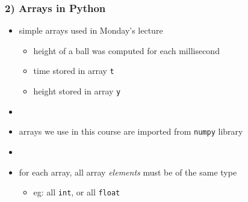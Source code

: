 \documentclass[14pt]{beamer}
\newcommand\red[1]{{\color{red} #1}}
\begin{document}
\begin{frame}[fragile]

\frametitle{2) Arrays in Python}

\begin{itemize}
	\item simple arrays used in Monday's lecture
	\begin{itemize}
		\item height of a ball was computed for each millisecond
		\item time stored in array \texttt{t}
		\item height stored in array \texttt{y}
	\end{itemize}
	\item[]
	\item arrays we use in this course are imported from \texttt{numpy} library
	\item[]
	\item for each array, all array \red{\emph{elements}} must be of the same type
	\begin{itemize}
		\item eg: all \texttt{int}, or all \texttt{float}
	\end{itemize}
		
\end{itemize}


\end{frame}

\end{document}
